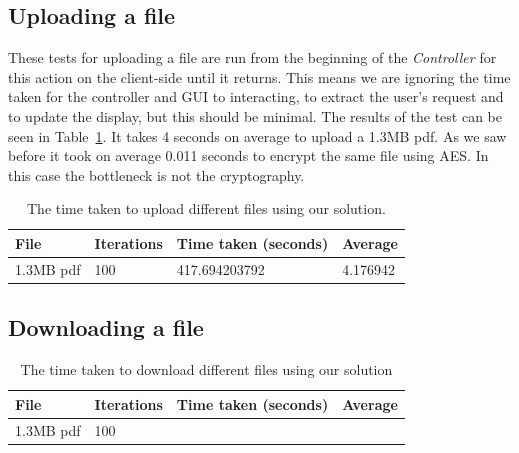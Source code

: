 \documentclass[12pt, titlepage]{article}
\begin{document}
\subsection{Uploading a file}
These tests for uploading a file are run from the beginning of the \textit{Controller} for this action on the client-side until it returns. This means we are ignoring the time taken for the controller and GUI to interacting, to extract the user's request and to update the display, but this should be minimal.
\newline \indent The results of the test can be seen in Table~\ref{tab:uploadBenchmark}. It takes 4 seconds on average to upload a 1.3MB pdf. As we saw before it took on average 0.011 seconds to encrypt the same file using AES. In this case the bottleneck is not the cryptography.

\begin{center}
\begin{table}[h!]
    \begin{tabular}{ | l | l | l | l |}
    \hline
    File & Iterations & Time taken (seconds) & Average \\ \hline
    
    1.3MB pdf & 100 & 417.694203792 & 4.176942 \\ \hline
    
    \end{tabular}
    \caption{The time taken to upload different files using our solution.} \label{tab:uploadBenchmark}
    \end{table}
\end{center}

\subsection{Downloading a file}

\begin{center}
\begin{table}[h!]
    \begin{tabular}{ | l | l | l | l |}
    \hline
    File & Iterations & Time taken (seconds) & Average \\ \hline
    
    1.3MB pdf  & 100 &   &  \\ \hline
    
    \end{tabular}
    \caption{The time taken to download different files using our solution} \label{tab:downloadBenchmark}
    \end{table}
\end{center}
\end{document}
